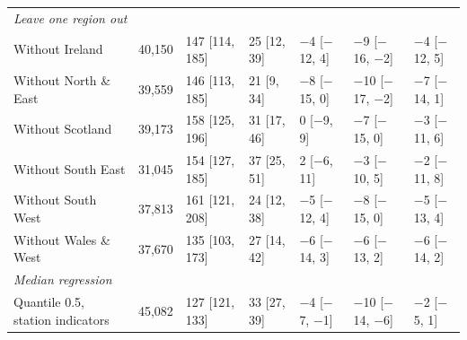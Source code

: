 \documentclass[11pt,a4paper]{article}
\begin{document}
\begin{table}[tbp]
{\begin{tabular}{p{5.4cm}rlllll}
\multicolumn{7}{l}{\textit{Leave one region out}}\\
\quad Without Ireland & 40,150 & 147 [114, 185] & 25 [12, 39] & $-$4 [$-$12, 4] & $-$9 [$-$16, $-$2] & $-$4 [$-$12, 5]\\
\quad Without North \& East & 39,559 & 146 [113, 185] & 21 [9, 34] & $-$8 [$-$15, 0] & $-$10 [$-$17, $-$2] & $-$7 [$-$14, 1]\\
\quad Without Scotland & 39,173 & 158 [125, 196] & 31 [17, 46] & 0 [$-$9, 9] & $-$7 [$-$15, 0] & $-$3 [$-$11, 6]\\
\quad Without South East & 31,045 & 154 [127, 185] & 37 [25, 51] & 2 [$-$6, 11] & $-$3 [$-$10, 5] & $-$2 [$-$11, 8]\\
\quad Without South West & 37,813 & 161 [121, 208] & 24 [12, 38] & $-$5 [$-$12, 4] & $-$8 [$-$15, 0] & $-$5 [$-$13, 4]\\
\quad Without Wales \& West & 37,670 & 135 [103, 173] & 27 [14, 42] & $-$6 [$-$14, 3] & $-$6 [$-$13, 2] & $-$6 [$-$14, 2]\\
\multicolumn{7}{l}{\textit{Median regression}}\\
\quad Quantile 0.5, station indicators & 45,082 & 127 [121, 133] & 33 [27, 39] & $-$4 [$-$7, $-$1] & $-$10 [$-$14, $-$6] & $-$2 [$-$5, 1]\\
\bottomrule\end{tabular}}\end{table}
\end{document}
